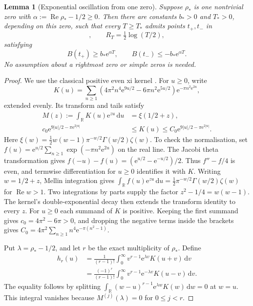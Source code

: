 \documentclass[11pt,a4paper]{article}
\newtheorem{lemma}[theorem]{Lemma}
\theoremstyle{remark}\newtheorem{remark}[theorem]{Remark}
\newcommand{\dd}{\,\mathrm d}
\newcommand{\e}{\mathrm e}
\newcommand{\Rea}{\operatorname{Re}}
\begin{document}
\begin{lemma}[Exponential oscillation from one zero]\label{lem:exp}
Suppose \(\rho_*\) is one nontrivial zero with
\(\alpha:=\Rea\rho_*-1/2\ge0\). Then there are constants
\(b_*>0\) and \(T_*>0\), depending on this zero, such that every
\(T\ge T_*\) admits points \(t_+,t_-\) in
\begin{equation}
 [T-R_T,T+R_T],\qquad R_T=\tfrac12\log(T/2),\label{eq:R}
\end{equation}
satisfying
\begin{equation}
 B(t_+)\ge b_*\e^{\alpha T},\qquad
 B(t_-)\le-b_*\e^{\alpha T}.\label{eq:exposc}
\end{equation}
No assumption about a rightmost zero or simple zeros is needed.
\end{lemma}
\begin{proof}
We use the classical positive even xi kernel \cite{Newman}. For
\(u\ge0\), write
\[
 K(u)=\sum_{n\ge1}
   (4\pi^2n^4\e^{9u/2}-6\pi n^2\e^{5u/2})
                 \e^{-\pi n^2\e^{2u}},
\]
extended evenly. Its transform and tails satisfy
\begin{align}
 M(z):=\int_{\mathbb R}K(u)\e^{zu}\dd u&=\xi(1/2+z),\nonumber\\
 c_0\e^{9|u|/2-\pi\e^{2|u|}}
 &\le K(u)\le C_0\e^{9|u|/2-\pi\e^{2|u|}}.\label{eq:K}
\end{align}
Here \(\xi(w)=\tfrac12 w(w-1)\pi^{-w/2}\Gamma(w/2)\zeta(w)\).
To check the normalisation, set
\(f(u)=\e^{u/2}\sum_{n\ge1}\exp(-\pi n^2\e^{2u})\) on the real line.
The Jacobi theta transformation gives
\(f(-u)-f(u)=(\e^{u/2}-\e^{-u/2})/2\). Thus \(f''-f/4\) is even,
and termwise differentiation for \(u\ge0\) identifies it with \(K\).
Writing \(w=1/2+z\), Mellin integration gives
\(\int_{\mathbb R}f(u)\e^{zu}\dd u
=\tfrac12\pi^{-w/2}\Gamma(w/2)\zeta(w)\) for \(\Rea w>1\).
Two integrations by parts supply the factor \(z^2-1/4=w(w-1)\).
The kernel's double-exponential decay then extends the transform
identity to every \(z\).
For \(u\ge0\) each summand of \(K\) is positive. Keeping the first
summand gives \(c_0=4\pi^2-6\pi>0\), and dropping the negative terms
inside the brackets gives
\(C_0=4\pi^2\sum_{n\ge1}n^4\e^{-\pi(n^2-1)}\).

Put \(\lambda=\rho_*-1/2\), and let \(r\) be the exact
multiplicity of \(\rho_*\). Define
\begin{align}
 h_r(u)
 &=\frac1{(r-1)!}\int_0^\infty
       v^{r-1}\e^{\lambda v}K(u+v)\dd v\nonumber\\
 &=\frac{(-1)^r}{(r-1)!}\int_0^\infty
       v^{r-1}\e^{-\lambda v}K(u-v)\dd v.\label{eq:h}
\end{align}
The equality follows by splitting
\(\int_{\mathbb R}(w-u)^{r-1}\e^{\lambda w}K(w)\dd w=0\)
at \(w=u\). This integral vanishes because
\(M^{(j)}(\lambda)=0\) for \(0\le j<r\).


\end{proof}
\end{document}

